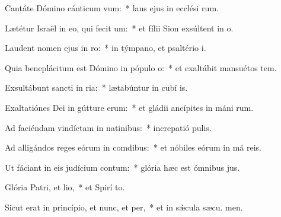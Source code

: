 \item Cantáte Dómino cánticum vum:~* laus ejus in ecclési rum.
\item Lætétur Israël in eo, qui fecit um:~* et fílii Sion exsúltent in  o.
\item Laudent nomen ejus in ro:~* in týmpano, et psaltério  i.
\item Quia beneplácitum est Dómino in pópulo o:~* et exaltábit mansuétos  tem.
\item Exsultábunt sancti in ria:~* lætabúntur in cubí is.
\item Exaltatiónes Dei in gútture erum:~* et gládii ancípites in máni rum.
\item Ad faciéndam vindíctam in natinibus:~* increpatió  pulis.
\item Ad alligándos reges eórum in comdibus:~* et nóbiles eórum in má reis.
\item Ut fáciant in eis judícium contum:~* glória hæc est ómnibus  jus.
\item Glória Patri, et lio,~* et Spirí to.
\item Sicut erat in princípio, et nunc, et per,~* et in sǽcula sæcu. men.
